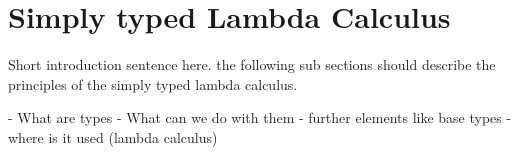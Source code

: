 \section{Simply typed Lambda Calculus}

Short introduction sentence here.
the following sub sections should describe
the principles of the simply typed lambda calculus.

- What are types
- What can we do with them
- further elements like base types
- where is it used (lambda calculus)


